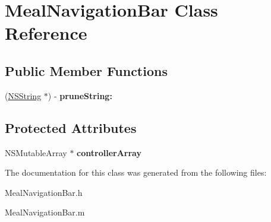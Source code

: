\hypertarget{interface_meal_navigation_bar}{
\section{MealNavigationBar Class Reference}
\label{interface_meal_navigation_bar}
}
\subsection*{Public Member Functions}
\begin{DoxyCompactItemize}
\item 
\hypertarget{interface_meal_navigation_bar_aebb0d0570b575e40cd79c652c90b4395}{
(\hyperlink{class_n_s_string}{NSString} $\ast$) -\/ {\bfseries pruneString:}}
\label{interface_meal_navigation_bar_aebb0d0570b575e40cd79c652c90b4395}

\end{DoxyCompactItemize}
\subsection*{Protected Attributes}
\begin{DoxyCompactItemize}
\item 
\hypertarget{interface_meal_navigation_bar_a89e819e77a458f217d23915499d7fc0b}{
NSMutableArray $\ast$ {\bfseries controllerArray}}
\label{interface_meal_navigation_bar_a89e819e77a458f217d23915499d7fc0b}

\end{DoxyCompactItemize}


The documentation for this class was generated from the following files:\begin{DoxyCompactItemize}
\item 
MealNavigationBar.h\item 
MealNavigationBar.m\end{DoxyCompactItemize}
